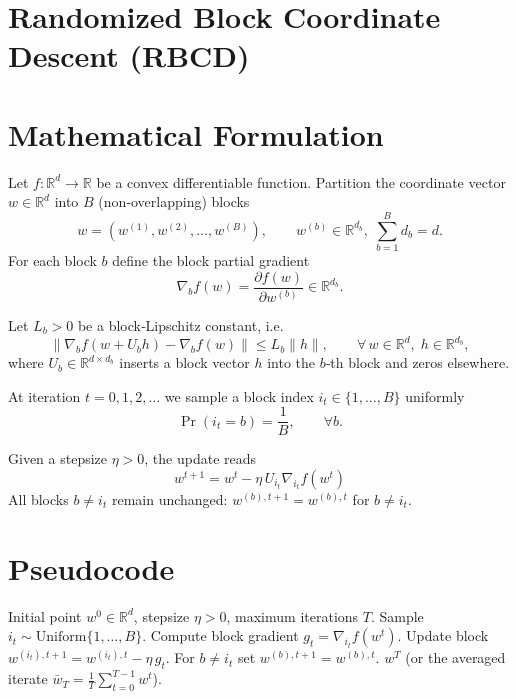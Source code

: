 \documentclass{article}
\begin{document}
\section*{Randomized Block Coordinate Descent (RBCD)}

\section*{Mathematical Formulation}
Let $f:\mathbb{R}^{d}\rightarrow\mathbb{R}$ be a convex differentiable function.  
Partition the coordinate vector $w\in\mathbb{R}^{d}$ into $B$ (non‑overlapping) blocks
\[
w=\left(w^{(1)},w^{(2)},\dots ,w^{(B)}\right),\qquad 
w^{(b)}\in\mathbb{R}^{d_{b}},\; \sum_{b=1}^{B}d_{b}=d .
\]
For each block $b$ define the block partial gradient
\[
\nabla_{b}f(w)=\frac{\partial f(w)}{\partial w^{(b)}}\in\mathbb{R}^{d_{b}} .
\]

Let $L_{b}>0$ be a block‑Lipschitz constant, i.e.
\[
\bigl\|\nabla_{b}f(w+U_{b}h)-\nabla_{b}f(w)\bigr\|
\le L_{b}\|h\|,\qquad \forall\,w\in\mathbb{R}^{d},\;h\in\mathbb{R}^{d_{b}},
\]
where $U_{b}\in\mathbb{R}^{d\times d_{b}}$ inserts a block vector $h$ into the $b$‑th block
and zeros elsewhere.

At iteration $t=0,1,2,\dots$ we sample a block index $i_{t}\in\{1,\dots ,B\}$ uniformly
\[
\Pr(i_{t}=b)=\frac{1}{B},\qquad \forall b .
\]

Given a stepsize $\eta>0$, the update reads
\[
\boxed{
w^{t+1}=w^{t}-\eta\,U_{i_{t}}\nabla_{i_{t}}f\!\left(w^{t}\right)
}
\tag{1}
\]
All blocks $b\neq i_{t}$ remain unchanged:
$w^{(b),t+1}=w^{(b),t}$ for $b\neq i_{t}$.

\section*{Pseudocode}
\begin{algorithm}[H]
\caption{Randomized Block Coordinate Descent}
\begin{algorithmic}[1]
\Require Initial point $w^{0}\in\mathbb{R}^{d}$, stepsize $\eta>0$, maximum iterations $T$.
    \State Sample $i_{t}\sim\text{Uniform}\{1,\dots ,B\}$.
    \State Compute block gradient $g_{t}= \nabla_{i_{t}}f\!\left(w^{t}\right)$.
    \State Update block $w^{(i_{t}),t+1}=w^{(i_{t}),t}-\eta\,g_{t}$.
    \State For $b\neq i_{t}$ set $w^{(b),t+1}=w^{(b),t}$.
\EndFor
\State \Return $w^{T}$ (or the averaged iterate $\bar w_{T}=\tfrac{1}{T}\sum_{t=0}^{T-1}w^{t}$).
\end{algorithmic}
\end{algorithm}
\end{document}
